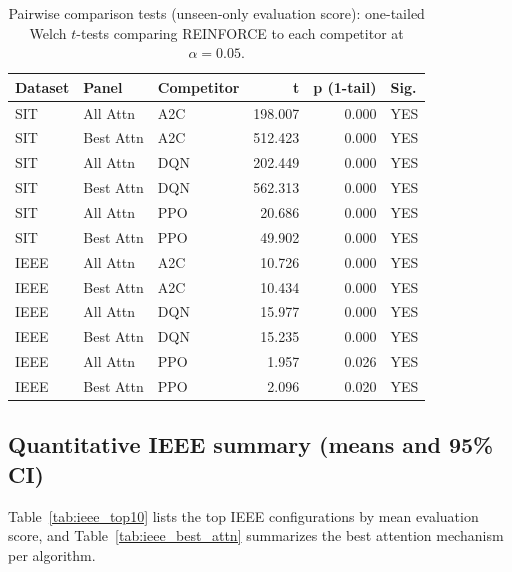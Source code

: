 \documentclass[sn-basic]{sn-jnl} %
\begin{document}
\begin{table}[t]
        \centering
        \caption{Pairwise comparison tests (unseen-only evaluation score): one-tailed Welch $t$-tests comparing REINFORCE to each competitor at $\alpha=0.05$.}
        \label{tab:hyp_tests}
        \begin{tabular}{l l l r r l}
        \toprule
        \textbf{Dataset} & \textbf{Panel} & \textbf{Competitor} & \textbf{t} & \textbf{p (1-tail)} & \textbf{Sig.}\\
        \midrule
        SIT & All Attn & A2C & 198.007 & 0.000 & YES\\
        SIT & Best Attn & A2C & 512.423 & 0.000 & YES\\
        SIT & All Attn & DQN & 202.449 & 0.000 & YES\\
        SIT & Best Attn & DQN & 562.313 & 0.000 & YES\\
        SIT & All Attn & PPO & 20.686 & 0.000 & YES\\
        SIT & Best Attn & PPO & 49.902 & 0.000 & YES\\
        IEEE & All Attn & A2C & 10.726 & 0.000 & YES\\
        IEEE & Best Attn & A2C & 10.434 & 0.000 & YES\\
        IEEE & All Attn & DQN & 15.977 & 0.000 & YES\\
        IEEE & Best Attn & DQN & 15.235 & 0.000 & YES\\
        IEEE & All Attn & PPO & 1.957 & 0.026 & YES\\
        IEEE & Best Attn & PPO & 2.096 & 0.020 & YES\\
        \bottomrule
        \end{tabular}
\end{table}

\subsection{Quantitative IEEE summary (means and 95\% CI)}
\label{sec:ieee_summary}
Table~\ref{tab:ieee_top10} lists the top IEEE configurations by mean evaluation score, and Table~\ref{tab:ieee_best_attn} summarizes the best attention mechanism per algorithm.
\end{document}
